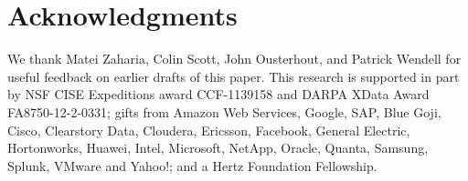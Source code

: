 \section{Acknowledgments}
We thank Matei Zaharia, Colin Scott, John Ousterhout, and Patrick Wendell for useful feedback on earlier drafts of this paper.
This research is supported in part by NSF CISE Expeditions award CCF-1139158 and DARPA XData Award FA8750-12-2-0331; gifts from Amazon Web Services, Google, SAP,  Blue Goji, Cisco, Clearstory Data, Cloudera, Ericsson, Facebook, General Electric, Hortonworks, Huawei, Intel, Microsoft, NetApp, Oracle, Quanta, Samsung, Splunk, VMware and Yahoo!; and
a Hertz Foundation Fellowship.
